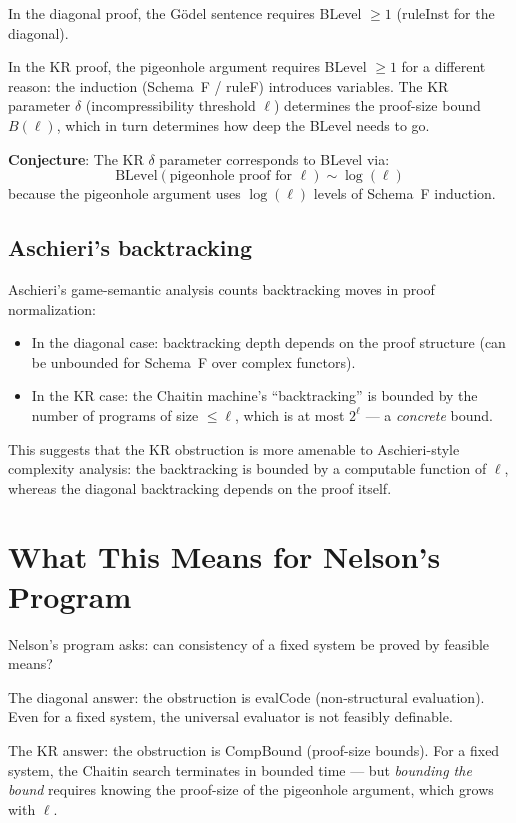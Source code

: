 \documentclass[11pt]{article}
\begin{document}
In the diagonal proof, the G\"odel sentence requires BLevel $\ge 1$ (ruleInst for the diagonal).

In the KR proof, the pigeonhole argument requires BLevel $\ge 1$ for a different reason: the induction (Schema~F / ruleF) introduces variables. The KR parameter $\delta$ (incompressibility threshold $\ell$) determines the proof-size bound $B(\ell)$, which in turn determines how deep the BLevel needs to go.

\textbf{Conjecture}: The KR $\delta$ parameter corresponds to BLevel via:
$$\mathrm{BLevel}(\text{pigeonhole proof for } \ell) \sim \log(\ell)$$
because the pigeonhole argument uses $\log(\ell)$ levels of Schema~F induction.

\subsection{Aschieri's backtracking}

Aschieri's game-semantic analysis counts backtracking moves in proof normalization:
\begin{itemize}
\item In the diagonal case: backtracking depth depends on the proof structure (can be unbounded for Schema~F over complex functors).
\item In the KR case: the Chaitin machine's ``backtracking'' is bounded by the number of programs of size $\le \ell$, which is at most $2^\ell$ --- a \emph{concrete} bound.
\end{itemize}

This suggests that the KR obstruction is more amenable to Aschieri-style complexity analysis: the backtracking is bounded by a computable function of $\ell$, whereas the diagonal backtracking depends on the proof itself.

\section{What This Means for Nelson's Program}

Nelson's program asks: can consistency of a fixed system be proved by feasible means?

The diagonal answer: the obstruction is evalCode (non-structural evaluation). Even for a fixed system, the universal evaluator is not feasibly definable.

The KR answer: the obstruction is CompBound (proof-size bounds). For a fixed system, the Chaitin search terminates in bounded time --- but \emph{bounding the bound} requires knowing the proof-size of the pigeonhole argument, which grows with $\ell$.
\end{document}
